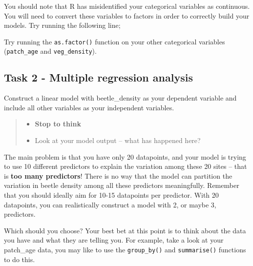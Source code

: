 \documentclass[
]{book}
\newenvironment{Shaded}{\begin{snugshade}}{\end{snugshade}}
\newcommand{\CommentTok}[1]{\textcolor[rgb]{0.56,0.35,0.01}{\textit{#1}}}
\newcommand{\FunctionTok}[1]{\textcolor[rgb]{0.13,0.29,0.53}{\textbf{#1}}}
\newcommand{\NormalTok}[1]{#1}
\newcommand{\OtherTok}[1]{\textcolor[rgb]{0.56,0.35,0.01}{#1}}
\newcommand{\SpecialCharTok}[1]{\textcolor[rgb]{0.81,0.36,0.00}{\textbf{#1}}}
\providecommand{\tightlist}{%
  \setlength{\itemsep}{0pt}\setlength{\parskip}{0pt}}
\begin{document}
You should note that R has misidentified your categorical variables as continuous. You will need to convert these variables to factors in order to correctly build your models. Try running the following line;

\begin{Shaded}
\end{Shaded}

Try running the \texttt{as.factor()} function on your other categorical variables (\texttt{patch\_age} and \texttt{veg\_density}).

\subsection{Task 2 - Multiple regression analysis}\label{task-2---multiple-regression-analysis}

Construct a linear model with beetle\_density as your dependent variable and include all other variables as your independent variables.

\begin{quote}
\begin{itemize}
\tightlist
\item
  \textbf{Stop to think}
\item
  Look at your model output -- what has happened here?
\end{itemize}
\end{quote}

The main problem is that you have only 20 datapoints, and your model is trying to use 10 different predictors to explain the variation among these 20 sites -- that is \textbf{too many predictors}! There is no way that the model can partition the variation in beetle density among all these predictors meaningfully. Remember that you should ideally aim for 10-15 datapoints per predictor. With 20 datapoints, you can realistically construct a model with 2, or maybe 3, predictors.

Which should you choose? Your best bet at this point is to think about the data you have and what they are telling you. For example, take a look at your patch\_age data, you may like to use the \texttt{group\_by()} and \texttt{summarise()} functions to do this.
\end{document}
